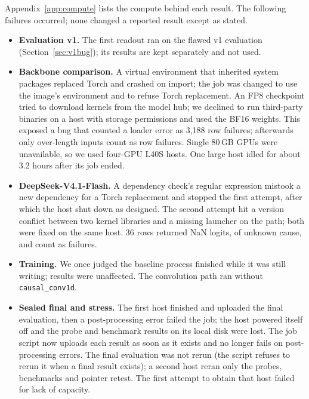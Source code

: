 Appendix~\ref{app:compute} lists the compute behind each result. The following failures
occurred; none changed a reported result
except as stated.
\begin{itemize}
  \item \textbf{Evaluation v1.} The first readout ran on the flawed v1 evaluation
    (Section~\ref{sec:v1bug}); its results are kept separately and not used.
  \item \textbf{Backbone comparison.} A virtual environment that inherited system packages
    replaced Torch and crashed on import; the job was changed to use the image's environment
    and to refuse Torch replacement. An FP8 checkpoint tried to download kernels from the
    model hub; we declined to run third-party binaries on a host with storage permissions and
    used the BF16 weights. This exposed a bug that counted a loader error as 3,188 row
    failures; afterwards only over-length inputs count as row failures. Single 80\,GB GPUs
    were unavailable, so we used four-GPU L40S hosts. One large host idled for about 3.2
    hours after its job ended.
  \item \textbf{DeepSeek-V4.1-Flash.} A dependency check's regular expression mistook a new
    dependency for a Torch replacement and stopped the first attempt, after which the host
    shut down as designed. The second attempt hit a version conflict between two
    kernel libraries and a missing launcher on the path; both were fixed on the same host.
    36 rows returned NaN logits, of unknown cause, and count as failures.
  \item \textbf{Training.} We once judged the baseline process finished while it was still
    writing; results were unaffected. The convolution path ran without
    \texttt{causal\_conv1d}.
  \item \textbf{Sealed final and stress.} The first host finished and uploaded the final
    evaluation, then a post-processing error failed the job; the host powered itself off and
    the probe and benchmark results on its local disk were lost. The job script now
    uploads each result as soon as it exists and no longer fails on post-processing errors.
    The final evaluation was not rerun (the script refuses to rerun it when a final result
    exists); a second host reran only the probes, benchmarks and pointer retest. The first
    attempt to obtain that host failed for lack of capacity.
\end{itemize}

